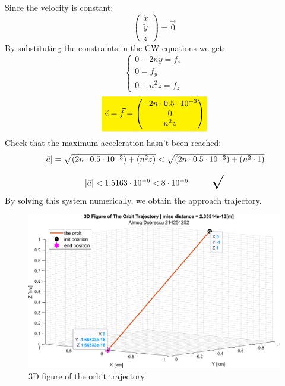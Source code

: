 \documentclass[11pt, a4paper]{article}
\begin{document}
\noindent Since the velocity is constant:
\begin{equation*}
    \begin{pmatrix}
        \ddot{x}\\
        \ddot{y}\\
        \ddot{z}
    \end{pmatrix} = \vec{0}
\end{equation*}
By substituting the constraints in the CW equations we get:
\begin{equation}
    \left\{\begin{array}{l}
        0-2n\dot{y}=f_x\\
        0=f_y\\
        0+n^2z=f_z
    \end{array}\right.
\end{equation}
\begin{equation}
    \colorbox{yellow}{$\vec{a} = \vec{f} = \begin{pmatrix}
        -2n\cdot0.5\cdot10^{-3}\\
        0\\
        n^2z
    \end{pmatrix}$}
\end{equation}
Check that the maximum acceleration hasn't been reached:
\begin{equation}
    \begin{array}{c}
        |\vec{a}| = \sqrt{\left(2n\cdot0.5\cdot10^{-3}\right) + \left(n^2z\right)} < \sqrt{\left(2n\cdot0.5\cdot10^{-3}\right) + \left(n^2\cdot1\right)} \\\\
        |\vec{a}| < 1.5163\cdot10^{-6} < 8\cdot10^{-6} \text{\hspace{1cm}\LARGE$\surd$}
    \end{array}
\end{equation}
By solving this system numerically, we obtain the approach trajectory.
\begin{figure}[H]
    \centering
    \includegraphics[width=1\textwidth]{images/graph1.png}
    \caption{3D figure of the orbit trajectory}
    \label{fig:3D-plot}
\end{figure}
\end{document}
